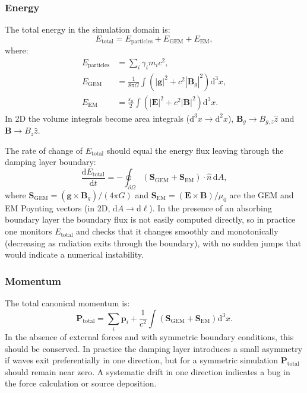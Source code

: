 \documentclass[11pt,a4paper]{article}
\newcommand{\vv}[1]{\mathbf{#1}}
\newcommand{\dd}{\mathrm{d}}
\begin{document}
\subsubsection*{Energy}

The total energy in the simulation domain is:
\begin{equation}
  E_{\mathrm{total}} = E_{\mathrm{particles}} + E_{\mathrm{GEM}} + E_{\mathrm{EM}},
\end{equation}
where:
\begin{align}
  E_{\mathrm{particles}} &= \sum_i \gamma_i m_i c^2, \\
  E_{\mathrm{GEM}}       &= \frac{1}{8\pi G}\int\!\!\left(|\vv{g}|^2 + c^2|\vv{B}_g|^2\right)\dd^3x, \\
  E_{\mathrm{EM}}        &= \frac{\varepsilon_0}{2}\int\!\!\left(|\vv{E}|^2 + c^2|\vv{B}|^2\right)\dd^3x.
\end{align}
In 2D the volume integrals become area integrals ($\dd^3x \to \dd^2x$), $\vv{B}_g \to B_{g,z}\hat{z}$ and $\vv{B} \to B_z\hat{z}$.

The rate of change of $E_{\mathrm{total}}$ should equal the energy flux leaving through the damping layer boundary:
\begin{equation}
  \frac{\dd E_{\mathrm{total}}}{\dd t} = -\oint_{\partial\Omega}(\vv{S}_{\mathrm{GEM}} + \vv{S}_{\mathrm{EM}})\cdot\hat{n}\,\dd A,
\end{equation}
where $\vv{S}_{\mathrm{GEM}} = (\vv{g}\times\vv{B}_g)/(4\pi G)$ and $\vv{S}_{\mathrm{EM}} = (\vv{E}\times\vv{B})/\mu_0$ are the GEM and EM Poynting vectors (in 2D, $\dd A \to \dd\ell$).  In the presence of an absorbing boundary layer the boundary flux is not easily computed directly, so in practice one monitors $E_{\mathrm{total}}$ and checks that it changes smoothly and monotonically (decreasing as radiation exits through the boundary), with no sudden jumps that would indicate a numerical instability.

\subsubsection*{Momentum}

The total canonical momentum is:
\begin{equation}
  \vv{P}_{\mathrm{total}} = \sum_i\vv{p}_i + \frac{1}{c^2}\int\!\!\left(\vv{S}_{\mathrm{GEM}} + \vv{S}_{\mathrm{EM}}\right)\dd^3x.
\end{equation}
In the absence of external forces and with symmetric boundary conditions, this should be conserved.  In practice the damping layer introduces a small asymmetry if waves exit preferentially in one direction, but for a symmetric simulation $\vv{P}_{\mathrm{total}}$ should remain near zero.  A systematic drift in one direction indicates a bug in the force calculation or source deposition.
\end{document}
